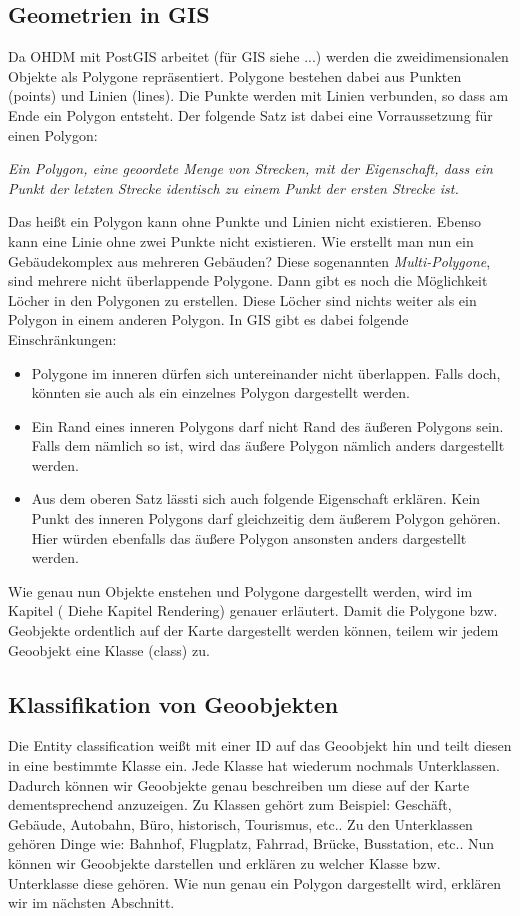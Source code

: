 \subsection{Geometrien in GIS}
Da OHDM mit PostGIS arbeitet (für GIS siehe ...) werden die zweidimensionalen Objekte als Polygone repräsentiert. Polygone bestehen dabei aus Punkten (points) und Linien (lines). Die Punkte werden mit Linien verbunden, so dass am Ende ein Polygon entsteht. Der folgende Satz ist dabei eine Vorraussetzung für einen Polygon:
\begin{center}
 \textit{Ein Polygon, eine geoordete Menge von Strecken, mit der Eigenschaft, dass ein Punkt der letzten Strecke identisch zu einem Punkt der ersten Strecke ist.}
 \end{center} 
Das heißt ein Polygon kann ohne Punkte und Linien nicht existieren. Ebenso kann eine Linie ohne zwei Punkte nicht existieren. Wie erstellt man nun ein Gebäudekomplex aus mehreren Gebäuden? Diese sogenannten \textit{Multi-Polygone}, sind mehrere nicht überlappende Polygone. Dann gibt es noch die Möglichkeit Löcher in den Polygonen zu erstellen. Diese Löcher sind nichts weiter als ein Polygon in einem anderen Polygon. In GIS gibt es dabei folgende Einschränkungen:
\begin{itemize}
\item Polygone im inneren dürfen sich untereinander nicht überlappen. Falls doch, könnten sie auch als ein einzelnes Polygon dargestellt werden.
\item Ein Rand eines inneren Polygons darf nicht Rand des äußeren Polygons sein. Falls dem nämlich so ist, wird das äußere Polygon nämlich anders dargestellt werden. %
\item Aus dem oberen Satz lässti sich auch folgende Eigenschaft erklären. Kein Punkt des inneren Polygons darf gleichzeitig dem äußerem Polygon gehören. Hier würden ebenfalls das äußere Polygon ansonsten anders dargestellt werden. %
\end{itemize}
Wie genau nun Objekte enstehen und Polygone dargestellt werden, wird im Kapitel ( Diehe Kapitel Rendering) genauer erläutert. Damit die Polygone bzw. Geobjekte ordentlich auf der Karte  dargestellt werden können, teilem wir jedem Geoobjekt eine Klasse (class) zu. 

\subsection{Klassifikation von Geoobjekten}
Die Entity classification weißt mit einer ID auf das Geoobjekt hin und teilt diesen in eine bestimmte Klasse ein. Jede Klasse hat wiederum nochmals Unterklassen. Dadurch können wir Geoobjekte genau beschreiben um diese auf der Karte dementsprechend anzuzeigen. Zu Klassen gehört zum Beispiel: Geschäft, Gebäude, Autobahn, Büro, historisch, Tourismus, etc.. Zu den Unterklassen gehören Dinge wie: Bahnhof, Flugplatz, Fahrrad, Brücke, Busstation, etc.. %
Nun können wir Geoobjekte darstellen und erklären zu welcher Klasse bzw. Unterklasse diese gehören. Wie nun genau ein Polygon dargestellt wird, erklären wir im nächsten Abschnitt.

